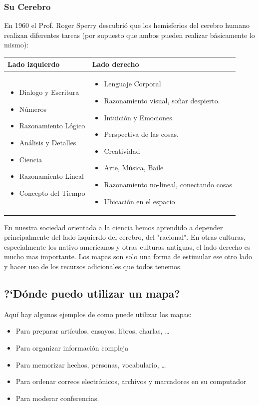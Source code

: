 \documentclass{article}
\begin{document}
\subsubsection*{Su Cerebro}
En 1960 el Prof. Roger Sperry descubri\'o que los hemisferios del cerebro humano realizan diferentes tareas (por supuesto que ambos pueden realizar b\'asicamente lo mismo):
\begin{center}
\begin{tabular}{|p{5.5cm}|p{5.5cm}|} \hline
	Lado izquierdo & Lado derecho \\ \hline
	\begin{itemize}
	   \item Dialogo y Escritura
	   \item N\'umeros
	   \item Razonamiento L\'ogico
	   \item An\'alisis y Detalles
	   \item Ciencia
	   \item Razonamiento Lineal
	   \item Concepto del Tiempo
	\end{itemize} &
	\begin{itemize}
		\item Lenguaje Corporal
		\item Razonamiento visual, so\~nar despierto.
		\item Intuici\'on y Emociones.
		\item Perspectiva de las cosas.
		\item Creatividad
		\item Arte, M\'usica, Baile
		\item Razonamiento no-lineal, conectando cosas
		\item Ubicaci\'on en el espacio
	\end{itemize}     \\ \hline
\end{tabular}	
\end{center}
En nuestra sociedad orientada a la ciencia hemos aprendido a depender principalmente del lado izquierdo del cerebro, del "racional". En otras culturas, especialmente los nativo americanos y otras culturas antiguas, el lado derecho es mucho mas importante. Los mapas son solo una forma de estimular ese otro lado y hacer uso de los recursos adicionales que todos tenemos.


\subsection{?`D\'onde puedo utilizar un mapa?}
Aqu\'i hay algunos ejemplos de como puede utilizar los mapas:
\begin{itemize}
    \item Para preparar art\'iculos, ensayos, libros, charlas, \ldots
    \item Para organizar informaci\'on compleja
    \item Para memorizar hechos, personas, vocabulario, \ldots
    \item Para ordenar correos electr\'onicos, archivos y marcadores en su computador
    \item Para moderar conferencias.
\end{itemize}
\end{document}
